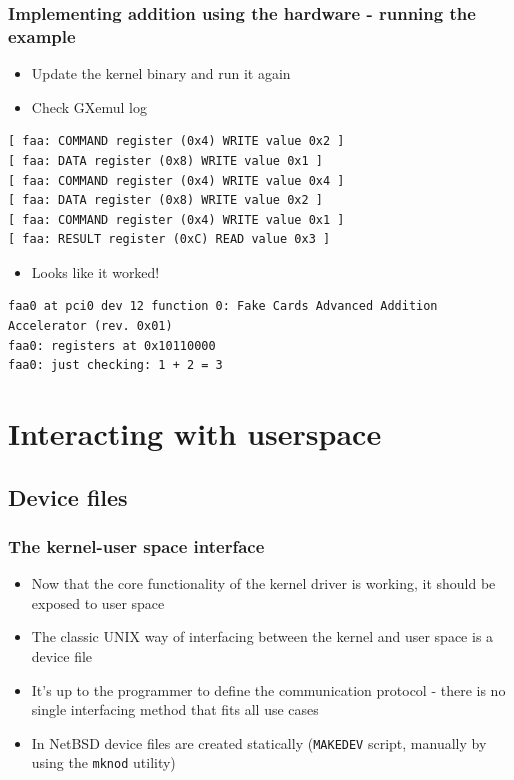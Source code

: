 \documentclass[dvipsnames,table]{beamer}
\begin{document}
\begin{frame}[fragile]
\frametitle{Implementing addition using the hardware - running the example}
\begin{itemize}
	\item Update the kernel binary and run it again
	\item Check GXemul log
\end{itemize}
\begin{verbatim}
[ faa: COMMAND register (0x4) WRITE value 0x2 ]
[ faa: DATA register (0x8) WRITE value 0x1 ]
[ faa: COMMAND register (0x4) WRITE value 0x4 ]
[ faa: DATA register (0x8) WRITE value 0x2 ]
[ faa: COMMAND register (0x4) WRITE value 0x1 ]
[ faa: RESULT register (0xC) READ value 0x3 ]
\end{verbatim}
\begin{itemize}
	\item Looks like it worked!
\end{itemize}
\tiny
\begin{verbatim}
faa0 at pci0 dev 12 function 0: Fake Cards Advanced Addition Accelerator (rev. 0x01)
faa0: registers at 0x10110000
faa0: just checking: 1 + 2 = 3
\end{verbatim}
\end{frame}

\section{Interacting with userspace}

\subsection{Device files}

\begin{frame}
\frametitle{The kernel-user space interface}
\begin{itemize}
	\item Now that the core functionality of the kernel driver is working, it should be exposed to user space
	\item The classic UNIX way of interfacing between the kernel and user space is a device file
	\item It's up to the programmer to define the communication protocol - there is no single interfacing method that fits all use cases
	\item In NetBSD device files are created statically ({\tt MAKEDEV} script, manually by using the {\tt mknod} utility)
\end{itemize}
\end{frame}
\end{document}
